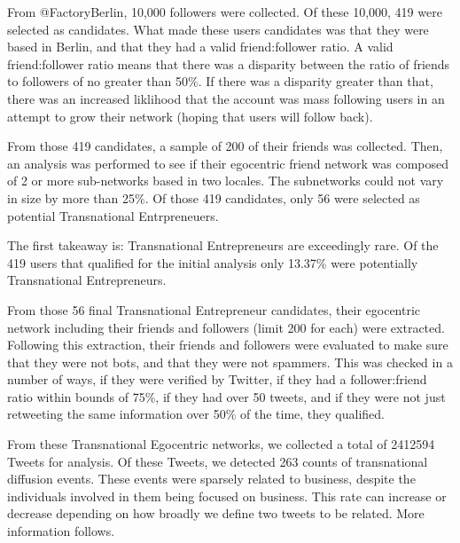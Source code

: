 From @FactoryBerlin, 10,000 followers were collected. Of these 10,000,
419 were selected as candidates. What made these users candidates was
that they were based in Berlin, and that they had a valid
friend:follower ratio. A valid friend:follower ratio means that there
was a disparity between the ratio of friends to followers of no
greater than 50\%. If there was a disparity greater than that, there
was an increased liklihood that the account was mass following users
in an attempt to grow their network (hoping that users will follow
back).

From those 419 candidates, a sample of 200 of their friends was
collected. Then, an analysis was performed to see if their egocentric
friend network was composed of 2 or more sub-networks based in two
locales.  The subnetworks could not vary in size by more than 25\%. Of
those 419 candidates, only 56 were selected as potential Transnational
Entrpreneuers.

The first takeaway is: Transnational Entrepreneurs are exceedingly
rare. Of the 419 users that qualified for the initial analysis only
13.37\% were potentially Transnational Entrepreneurs.

From those 56 final Transnational Entrepreneur candidates, their
egocentric network including their friends and followers (limit 200
for each) were extracted. Following this extraction, their friends and
followers were evaluated to make sure that they were not bots, and that
they were not spammers. This was checked in a number of ways, if they
were verified by Twitter, if they had a follower:friend ratio within
bounds of 75\%, if they had over 50 tweets, and if they were not just
retweeting the same information over 50\% of the time, they qualified.

From these Transnational Egocentric networks, we collected a total of
2412594 Tweets for analysis. Of these Tweets, we detected 263 counts
of transnational diffusion events. These events were sparsely related
to business, despite the individuals involved in them being focused on
business. This rate can increase or decrease depending on how broadly
we define two tweets to be related. More information follows.

